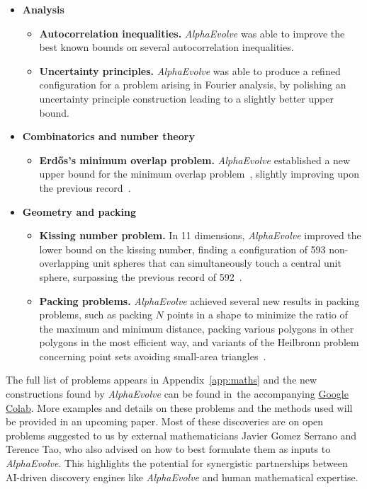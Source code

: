 \documentclass[logo,copyright,12pt]{googledeepmind}
\theoremstyle{definition}
\theoremstyle{remark}
\theoremstyle{plain}
\newcommand{\ResultsColabURL}{https://colab.research.google.com/github/google-deepmind/alphaevolve\_results/blob/master/mathematical\_results.ipynb}
\newcommand{\ResultsColab}{the accompanying \href{\ResultsColabURL}{Google Colab}}
\newcommand{\method}{\emph{AlphaEvolve}\xspace}
\begin{document}
\begin{itemize}
    \item \textbf{Analysis} 
    \begin{itemize}
        \item \textbf{Autocorrelation inequalities.} \method was able to improve the best known bounds on several autocorrelation inequalities.
        \item \textbf{Uncertainty principles.} \method was able to produce a refined configuration for a problem arising in Fourier analysis, by polishing an uncertainty principle construction \cite{gonccalves2017hermite} leading to a slightly better upper bound. 
    \end{itemize}

    \item \textbf{Combinatorics and number theory}
        \begin{itemize}
            \item \textbf{Erd\H{o}s's minimum overlap problem.} \method established a new upper bound for the minimum overlap problem~\cite{erdHos1955some}, slightly improving upon the previous record~\cite{haugland2016minimum}.
        \end{itemize}

    \item \textbf{Geometry and packing}
        \begin{itemize}
            \item \textbf{Kissing number problem.} In 11 dimensions, \method improved the lower bound on the kissing number, finding a configuration of 593 non-overlapping unit spheres that can simultaneously touch a central unit sphere, surpassing the previous record of 592~\citep{kissing_11}. 
            \item \textbf{Packing problems.} \method achieved several new results in packing problems, such as packing $N$ points in a shape to minimize the ratio of the maximum and minimum distance, packing various polygons in other polygons in the most efficient way, and variants of the Heilbronn problem concerning point sets avoiding small-area triangles~\cite{geometry_collection}.
        \end{itemize}
\end{itemize}

The full list of problems appears in Appendix~\ref{app:maths} and the new constructions found by \method can be found in~\ResultsColab.
More examples and details on these problems and the methods used will be provided in an upcoming paper.
Most of these discoveries are on open problems suggested to us by external mathematicians Javier Gomez Serrano and Terence Tao, who also advised on how to best formulate them as inputs to \method.
This highlights the potential for synergistic partnerships between AI-driven discovery engines like \method and human mathematical expertise.
\end{document}
